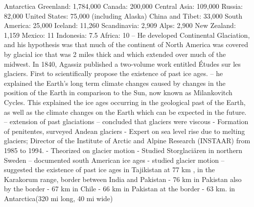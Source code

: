             \ddd Antarctica
            \ddd Greenland:	1,784,000
            \ddd Canada: 200,000
            \ddd Central Asia:	109,000
            \ddd Russia:	82,000
            \ddd United States:	75,000 (including Alaska)
            \ddd China and Tibet:	33,000
            \ddd South America: 25,000
            \ddd Iceland:	11,260
            \ddd Scandinavia:	2,909
            \ddd Alps: 2,900
            \ddd New Zealand:	1,159
            \ddd Mexico: 11
            \ddd Indonesia:	7.5
            \ddd Africa: 10
        	 – He developed Continental Glaciation, and his hypothesis was that much of the continent of North America was covered by glacial ice that was 2 miles thick and which extended over much of the midwest. In 1840, Agassiz published a two-volume work entitled Études sur les glaciers. First to scientifically propose the existence of past ice ages. 
        	 – he explained the Earth’s long term climate changes caused by changes in the position of the Earth in comparison to the Sun, now known as Milankovitch Cycles. This explained the ice ages occurring in the geological past of the Earth, as well as the climate changes on the Earth which can be expected in the future. 
        	 – extension of past glaciations 
        	 – concluded that glaciers were viscous 
        	 - Formation of penitentes, surveyed Andean glaciers 
        	 - Expert on sea level rise due to melting glaciers; Director of the Institute of Arctic and Alpine Research (INSTAAR) from 1985 to 1994. 
        	 - Theorized on glacier motion 
        	 - Studied Storglaciären in northern Sweden 
        	 – documented south American ice ages 
        	 - studied glacier motion 
        	 – suggested the existence of past ice ages
		     in Tajikistan at 77 km
		    , in the Karakorum range, border between India and Pakistan - 76 km
		     in Pakistan also by the border - 67 km
		     in Chile - 66 km
		     in Pakistan at the border - 63 km.  
		     in Antarctica(320 mi long, 40 mi wide)
